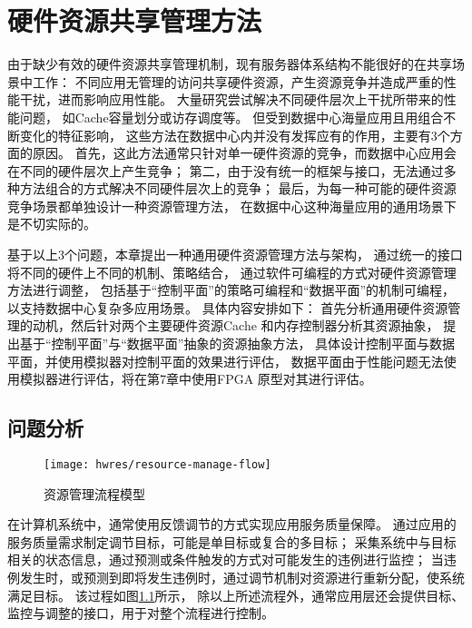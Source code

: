 

\chapter{硬件资源共享管理方法}
\label{chap:hwresman}

由于缺少有效的硬件资源共享管理机制，现有服务器体系结构不能很好的在共享场景中工作：
不同应用无管理的访问共享硬件资源，产生资源竞争并造成严重的性能干扰，进而影响应用性能。
大量研究尝试解决不同硬件层次上干扰所带来的性能问题，
如Cache容量划分\cite{}或访存调度\cite{}等。
但受到数据中心海量应用\cite{}且用组合不断变化的特征影响，
这些方法在数据中心内并没有发挥应有的作用，主要有3个方面的原因。
首先，这此方法通常只针对单一硬件资源的竞争，而数据中心应用会在不同的硬件层次上产生竞争；
第二，由于没有统一的框架与接口，无法通过多种方法组合的方式解决不同硬件层次上的竞争；
最后，为每一种可能的硬件资源竞争场景都单独设计一种资源管理方法，
在数据中心这种海量应用的通用场景下是不切实际的。

基于以上3个问题，本章提出一种通用硬件资源管理方法与架构，
通过统一的接口将不同的硬件上不同的机制、策略结合，
通过软件可编程的方式对硬件资源管理方法进行调整，
包括基于``控制平面''的策略可编程和``数据平面''的机制可编程，以支持数据中心复杂多应用场景。
具体内容安排如下：
首先分析通用硬件资源管理的动机，然后针对两个主要硬件资源Cache 和内存控制器分析其资源抽象，
提出基于``控制平面''与``数据平面''抽象的资源抽象方法，
具体设计控制平面与数据平面，并使用模拟器对控制平面的效果进行评估，
数据平面由于性能问题无法使用模拟器进行评估，将在第7章中使用FPGA 原型对其进行评估。


\section{问题分析}

\begin{figure}[tb]
  \centering
  \texttt{[image: hwres/resource-manage-flow]}
  \caption{资源管理流程模型}
  \label{fig:resource-manage-flow}
\end{figure}

在计算机系统中，通常使用反馈调节的方式实现应用服务质量保障。
通过应用的服务质量需求制定调节目标，可能是单目标或复合的多目标；
采集系统中与目标相关的状态信息，通过预测或条件触发的方式对可能发生的违例进行监控；
当违例发生时，或预测到即将发生违例时，通过调节机制对资源进行重新分配，使系统满足目标。
该过程如图\ref{fig:resource-manage-flow}所示，
除以上所述流程外，通常应用层还会提供目标、监控与调整的接口，用于对整个流程进行控制。

